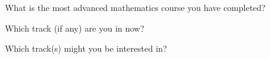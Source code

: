 \documentclass{ximera}
\begin{document}
\newpage 

\begin{question}
What is the most advanced mathematics course you have completed?    
\begin{freeResponse}
\end{freeResponse}
\end{question}

\begin{question}
Which track (if any) are you in now?  
\begin{freeResponse}
\end{freeResponse}
\end{question}

\begin{question}
Which track(s) might you be interested in? 
\begin{freeResponse}
\end{freeResponse}
\end{question}
\end{document}
